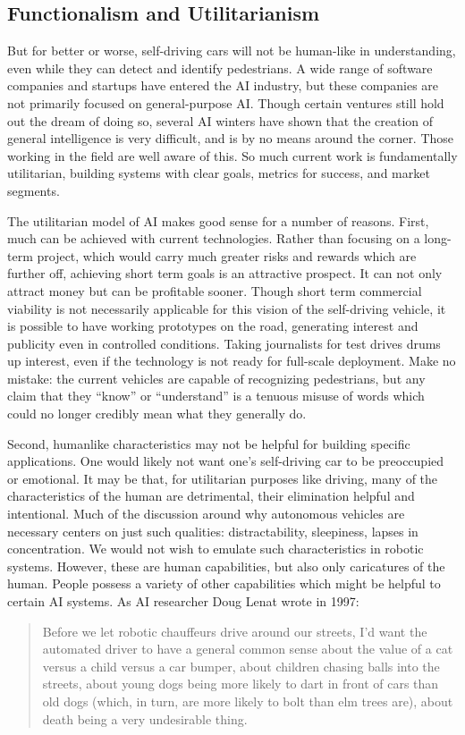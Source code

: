 \subsection{Functionalism and Utilitarianism} 
But for better or worse, self-driving cars will not be human-like in
understanding, even while they can detect and identify pedestrians.
A wide range of software companies and startups have entered the AI
industry, but these companies are not primarily focused on
general-purpose AI. Though certain ventures still hold out the dream
of doing so, several AI winters have shown that the creation of
general intelligence is very difficult, and is by no means around the
corner. Those working in the field are well aware of
this.\cite{???-articlerebuttingmusk} So much current work is
fundamentally utilitarian, building systems with clear goals, metrics
for success, and market segments.

The utilitarian model of AI makes good sense for a number of reasons.
First, much can be achieved with current technologies. Rather than
focusing on a long-term project, which would carry much greater risks
and rewards which are further off, achieving short term goals is an
attractive prospect. It can not only attract money but can be
profitable sooner. Though short term commercial viability is not
necessarily applicable for this vision of the self-driving vehicle, it
is possible to have working prototypes on the road, generating
interest and publicity even in controlled conditions. Taking
journalists for test drives drums up interest, even if the technology
is not ready for full-scale deployment. Make no mistake: the current
vehicles are capable of recognizing pedestrians, but any claim that
they ``know'' or ``understand'' is a tenuous misuse of words which
could no longer credibly mean what they generally do. 

Second, humanlike characteristics may not be helpful for building
specific applications. One would likely not want one's self-driving car
to be preoccupied or emotional.\cite{???-wiredFutureofAI} It may be that, for utilitarian
purposes like driving, many of the characteristics of the human are
detrimental, their elimination helpful and intentional. Much of the
discussion around why autonomous vehicles are necessary centers on
just such qualities: distractability, sleepiness, lapses in
concentration.\cite{???} We would not wish to emulate such
characteristics in robotic systems. However, these are human
capabilities, but also only caricatures of the human. People possess a
variety of other capabilities which might be helpful to certain AI
systems. As AI researcher Doug Lenat wrote in 1997:
\begin{quote}
Before we let robotic chauffeurs drive around our streets, I'd want the
  automated driver to have a general common sense about the value of a
cat versus a child versus a car bumper, about children chasing balls
into the streets, about young dogs being more likely to dart in front
of cars than old dogs (which, in turn, are more likely to bolt than
elm trees are), about death being a very undesirable thing.\cite[p.
  122]{ekbia}\end{quote} 

